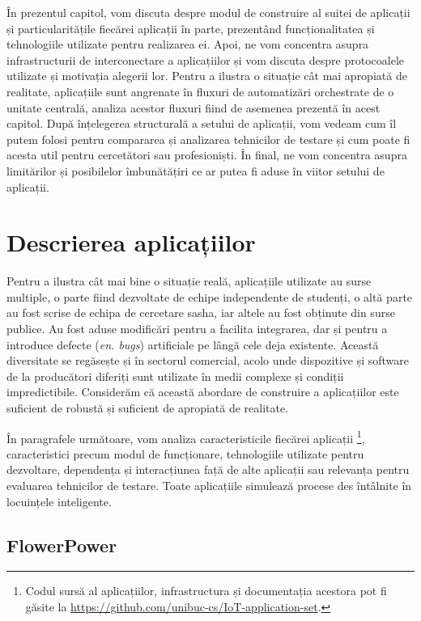 În prezentul capitol, vom discuta despre modul de construire al suitei de aplicații și particularitățile fiecărei aplicații în parte, prezentând funcționalitatea și tehnologiile utilizate pentru realizarea ei. Apoi, ne vom concentra asupra infrastructurii de interconectare a aplicațiilor și vom discuta despre protocoalele utilizate și motivația alegerii lor. Pentru a ilustra o situație cât mai apropiată de realitate, aplicațiile sunt angrenate în fluxuri de automatizări orchestrate de o unitate centrală, analiza acestor fluxuri fiind de asemenea prezentă în acest capitol. După înțelegerea structurală a setului de aplicații, vom vedeam cum îl putem folosi pentru compararea și analizarea tehnicilor de testare și cum poate fi acesta util pentru cercetători sau profesioniști. În final, ne vom concentra asupra limitărilor și posibilelor îmbunătățiri ce ar putea fi aduse în viitor setului de aplicații.

\section{Descrierea aplicațiilor}

Pentru a ilustra cât mai bine o situație reală, aplicațiile utilizate au surse multiple, o parte fiind dezvoltate de echipe independente de studenți, o altă parte au fost scrise de echipa de cercetare \acrshort{sasha}, iar altele au fost obținute din surse publice. Au fost aduse modificări pentru a facilita integrarea, dar și pentru a introduce defecte (\textit{en. bugs}) artificiale pe lângă cele deja existente. Această diversitate se regăsește și în sectorul comercial, acolo unde dispozitive și software de la producători diferiți sunt utilizate în medii complexe și condiții impredictibile. Considerăm că această abordare de construire a aplicațiilor este suficient de robustă și suficient de apropiată de realitate.

În paragrafele următoare, vom analiza caracteristicile fiecărei aplicații \footnote{Codul sursă al aplicațiilor, infrastructura și documentația acestora pot fi găsite la \url{https://github.com/unibuc-cs/IoT-application-set}.}, caracteristici precum modul de funcționare, tehnologiile utilizate pentru dezvoltare, dependența și interacțiunea față de alte aplicații sau relevanța pentru evaluarea tehnicilor de testare. Toate aplicațiile simulează procese des întâlnite în locuințele inteligente.

\subsection*{FlowerPower}

